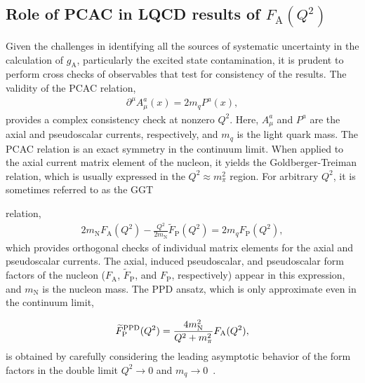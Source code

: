 \documentclass{ar-1col}
\begin{document}
\subsection{Role of PCAC in LQCD results of $F_{\mathrm{A}}(Q^2)$\label{sec:lqcd_pcac}}

Given the challenges in identifying all the sources of systematic uncertainty in the calculation of $g_{\mathrm{A}}$, particularly the excited state contamination, it is prudent to perform cross checks of observables that test for consistency of the results.
The validity of the PCAC relation,
\begin{align}
 \partial^\mu A^{a}_{\mu}(x) = 2 m_q P^{a}(x),
 \label{eq:pcac}
\end{align}
provides a complex consistency check at nonzero $Q^2$.
Here, $A^{a}_\mu$ and $P^{a}$ are the axial and pseudoscalar currents,
 respectively, and $m_q$ is the light quark mass.
The PCAC relation is an exact symmetry in the continuum limit.
When applied to the axial current matrix element of the nucleon, it yields the Goldberger-Treiman relation, which is usually expressed in the $Q^2\approx m_\pi^2$ region.  For arbitrary $Q^2$, it is sometimes referred to as the GGT%
 \begin{marginnote}
 \end{marginnote}%
 relation,
\begin{align}
 2 m_{\mathrm{N}} F_{\mathrm{A}}(Q^2) -\frac{Q^2}{2m_{\mathrm{N}}} \widetilde{F}_{\mathrm{P}}(Q^2) = 2 m_q F_{\mathrm{P}}(Q^2),
 \label{eq:ggt}
\end{align}
 which provides orthogonal checks of individual matrix elements
 for the axial and pseudoscalar currents.
The axial, induced pseudoscalar, and pseudoscalar form factors of the nucleon
 ($F_{\mathrm{A}}$, $\widetilde{F}_{\mathrm{P}}$, and $F_{\mathrm{P}}$, respectively) appear in this expression,
 and $m_{\mathrm{N}}$ is the nucleon mass.
The PPD ansatz, which is only approximate even in the continuum limit,%
\begin{marginnote}
 \end{marginnote}%
\begin{align}
 \widetilde{F}^{\rm PPD}_{\mathrm{P}}(Q^2) = \frac{4m_{\mathrm{N}}^2}{Q^2+m_\pi^2} F_{\mathrm{A}}(Q^2),
 \label{eq:ppd}
\end{align}
is obtained
 by carefully considering the leading asymptotic behavior of the
 form factors in the double limit $Q^2\to0$ and $m_q\to0$~\cite{Sasaki:2007gw}.
\end{document}
